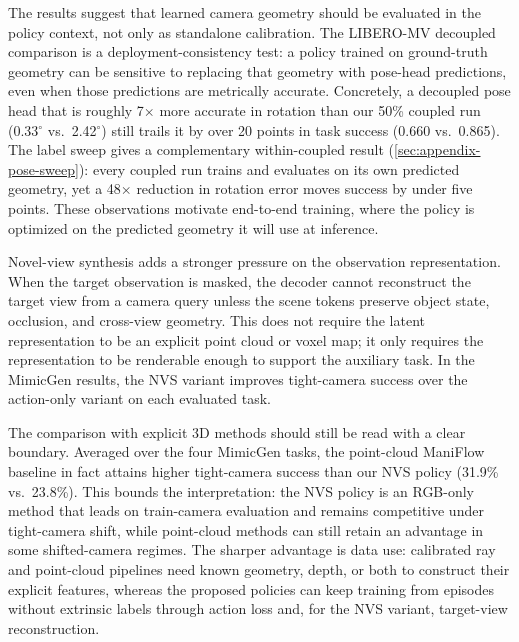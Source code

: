 The results suggest that learned camera geometry should be evaluated in the policy context, not only as standalone calibration.  The LIBERO-MV decoupled comparison is a deployment-consistency test: a policy trained on ground-truth geometry can be sensitive to replacing that geometry with pose-head predictions, even when those predictions are metrically accurate.  Concretely, a decoupled pose head that is roughly 7$\times$ more accurate in rotation than our 50\% coupled run (0.33$^\circ$ vs.\ 2.42$^\circ$) still trails it by over 20 points in task success (0.660 vs.\ 0.865).  The label sweep gives a complementary within-coupled result (\autoref{sec:appendix-pose-sweep}): every coupled run trains and evaluates on its own predicted geometry, yet a 48$\times$ reduction in rotation error moves success by under five points.  These observations motivate end-to-end training, where the policy is optimized on the predicted geometry it will use at inference.

Novel-view synthesis adds a stronger pressure on the observation representation.  When the target observation is masked, the decoder cannot reconstruct the target view from a camera query unless the scene tokens preserve object state, occlusion, and cross-view geometry.  This does not require the latent representation to be an explicit point cloud or voxel map; it only requires the representation to be renderable enough to support the auxiliary task.  In the MimicGen results, the NVS variant improves tight-camera success over the action-only variant on each evaluated task.

The comparison with explicit 3D methods should still be read with a clear boundary.  Averaged over the four MimicGen tasks, the point-cloud ManiFlow baseline in fact attains higher tight-camera success than our NVS policy (31.9\% vs.\ 23.8\%).  This bounds the interpretation: the NVS policy is an RGB-only method that leads on train-camera evaluation and remains competitive under tight-camera shift, while point-cloud methods can still retain an advantage in some shifted-camera regimes.  The sharper advantage is data use: calibrated ray and point-cloud pipelines need known geometry, depth, or both to construct their explicit features, whereas the proposed policies can keep training from episodes without extrinsic labels through action loss and, for the NVS variant, target-view reconstruction.
